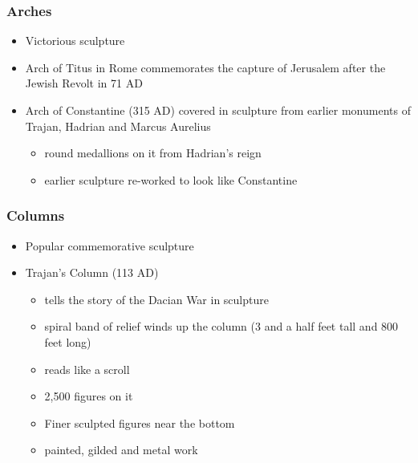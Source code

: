 \documentclass[12pt, twoside]{article}
\begin{document}
\subsubsection{Arches}
\begin{itemize}
\item Victorious sculpture
\item Arch of Titus in Rome commemorates the capture of Jerusalem after the Jewish Revolt in 71 AD
\item Arch of Constantine (315 AD) covered in sculpture from earlier monuments of Trajan, Hadrian and Marcus Aurelius
	\begin{itemize}
	\item round medallions on it from Hadrian’s reign
	\item earlier sculpture re-worked to look like Constantine
	\end{itemize}
\end{itemize}

\subsubsection{Columns}
\begin{itemize}
\item Popular commemorative sculpture
\item Trajan’s Column (113 AD)
	\begin{itemize}
	\item tells the story of the Dacian War in sculpture
	\item spiral band of relief winds up the column (3 and a half feet tall and 800 feet long)
	\item reads like a scroll
	\item 2,500 figures on it
	\item Finer sculpted figures near the bottom
	\item painted, gilded and metal work
	\end{itemize}
\end{itemize}
\end{document}
